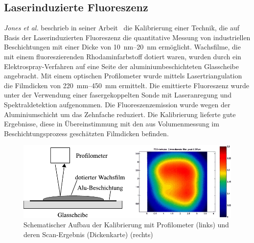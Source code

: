 \subsection{Laserinduzierte Fluoreszenz}
\label{sub:laserinduzierte_fluoreszenz}

\textit{Jones et al.} beschrieb in seiner Arbeit~\cite{jones_2001} die Kalibrierung einer Technik, die auf Basis der Laserinduzierten Fluoreszenz die quantitative Messung von industriellen Beschichtungen mit einer Dicke von \SIrange{10}{20}{\nano\meter} ermöglicht.
Wachsfilme, die mit einem fluoreszierenden Rhodaminfarbstoff dotiert waren, wurden durch ein Elektrospray-Verfahren auf eine Seite der aluminiumbeschichteten Glasscheibe angebracht.
Mit einem optischen Profilometer wurde mittels Lasertriangulation die Filmdicken von \SIrange{220}{450}{\milli\meter} ermittelt.
Die emittierte Fluoreszenz wurde unter der Verwendung einer fasergekoppelten Sonde mit Laseranregung und Spektraldetektion aufgenommen.
Die Fluoreszenzemission wurde wegen der Aluminiumschicht um das Zehnfache reduziert.
Die Kalibrierung lieferte gute Ergebnisse, diese in Übereinstimmung mit den aus Volumenmessung im Beschichtungsprozess geschätzten Filmdicken befinden.

\begin{figure}[htb]
    \centering
    \includegraphics[]{./images/schematic_profilometer_and_scan_result_jones.pdf}
    \caption{Schematischer Aufbau der Kalibrierung mit Profilometer (links) und deren Scan-Ergebnis (Dickenkarte) (rechts)~\cite{jones_2001}}
    \label{fig:aufbau_laserinduzierte_kalibrierung_jones}
\end{figure}
